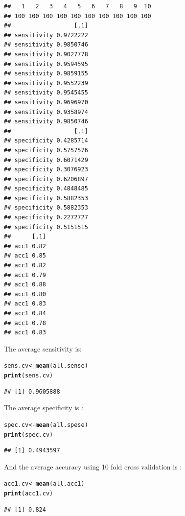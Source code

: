 \documentclass{article}\usepackage[]{graphicx}\usepackage[]{color}
\makeatletter
\newcommand{\hlstd}[1]{\textcolor[rgb]{0.345,0.345,0.345}{#1}}%
\newcommand{\hlkwb}[1]{\textcolor[rgb]{0.69,0.353,0.396}{#1}}%
\newcommand{\hlkwd}[1]{\textcolor[rgb]{0.737,0.353,0.396}{\textbf{#1}}}%
\newenvironment{kframe}{%
 \def\at@end@of@kframe{}%
 \ifinner\ifhmode%
  \def\at@end@of@kframe{\end{minipage}}%
  \begin{minipage}{\columnwidth}%
 \fi\fi%
 \def\FrameCommand##1{\hskip\@totalleftmargin \hskip-\fboxsep
 \colorbox{shadecolor}{##1}\hskip-\fboxsep
     \hskip-\linewidth \hskip-\@totalleftmargin \hskip\columnwidth}%
 \MakeFramed {\advance\hsize-\width
   \@totalleftmargin\z@ \linewidth\hsize
   \@setminipage}}%
 {\par\unskip\endMakeFramed%
 \at@end@of@kframe}
\newenvironment{knitrout}{}{} %
\makeatother
\begin{document}
\begin{knitrout}
\color{fgcolor}\begin{kframe}
\begin{verbatim}
##   1   2   3   4   5   6   7   8   9  10 
## 100 100 100 100 100 100 100 100 100 100
##                  [,1]
## sensitivity 0.9722222
## sensitivity 0.9850746
## sensitivity 0.9027778
## sensitivity 0.9594595
## sensitivity 0.9859155
## sensitivity 0.9552239
## sensitivity 0.9545455
## sensitivity 0.9696970
## sensitivity 0.9358974
## sensitivity 0.9850746
##                  [,1]
## specificity 0.4285714
## specificity 0.5757576
## specificity 0.6071429
## specificity 0.3076923
## specificity 0.6206897
## specificity 0.4848485
## specificity 0.5882353
## specificity 0.5882353
## specificity 0.2272727
## specificity 0.5151515
##      [,1]
## acc1 0.82
## acc1 0.85
## acc1 0.82
## acc1 0.79
## acc1 0.88
## acc1 0.80
## acc1 0.83
## acc1 0.84
## acc1 0.78
## acc1 0.83
\end{verbatim}
\end{kframe}
\end{knitrout}
The average sensitivity is:
\begin{knitrout}
\color{fgcolor}\begin{kframe}
\begin{alltt}
\hlstd{sens.cv}\hlkwb{<-}\hlkwd{mean}\hlstd{(all.sense)}
\hlkwd{print}\hlstd{(sens.cv)}
\end{alltt}
\begin{verbatim}
## [1] 0.9605888
\end{verbatim}
\end{kframe}
\end{knitrout}
The average specificity is :
\begin{knitrout}
\color{fgcolor}\begin{kframe}
\begin{alltt}
\hlstd{spec.cv}\hlkwb{<-}\hlkwd{mean}\hlstd{(all.spese)}
\hlkwd{print}\hlstd{(spec.cv)}
\end{alltt}
\begin{verbatim}
## [1] 0.4943597
\end{verbatim}
\end{kframe}
\end{knitrout}
And the average accuracy using 10 fold cross validation is :
\begin{knitrout}
\color{fgcolor}\begin{kframe}
\begin{alltt}
\hlstd{acc1.cv}\hlkwb{<-}\hlkwd{mean}\hlstd{(all.acc1)}
\hlkwd{print}\hlstd{(acc1.cv)}
\end{alltt}
\begin{verbatim}
## [1] 0.824
\end{verbatim}
\end{kframe}
\end{knitrout}
\end{document}
